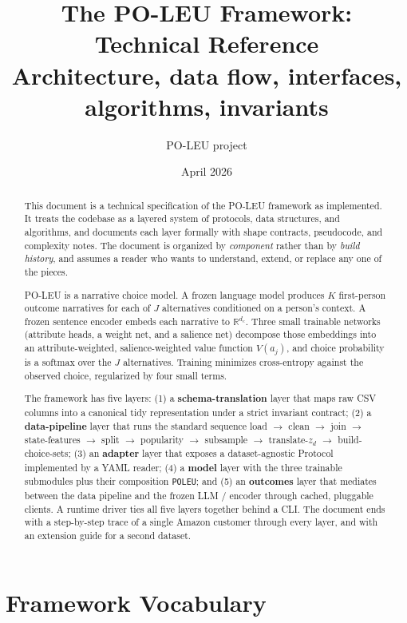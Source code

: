 \documentclass[11pt,a4paper]{article}
\title{The PO-LEU Framework: Technical Reference \\
\large Architecture, data flow, interfaces, algorithms, invariants}
\author{PO-LEU project}
\date{April 2026}
\begin{document}
\maketitle

\begin{abstract}
\noindent
This document is a technical specification of the PO-LEU framework as
implemented. It treats the codebase as a layered system of protocols,
data structures, and algorithms, and documents each layer formally with
shape contracts, pseudocode, and complexity notes. The document is
organized by \emph{component} rather than by \emph{build history}, and
assumes a reader who wants to understand, extend, or replace any one of
the pieces.

PO-LEU is a narrative choice model. A frozen language model produces
$K$ first-person outcome narratives for each of $J$ alternatives
conditioned on a person's context. A frozen sentence encoder embeds
each narrative to $\mathbb{R}^{d_e}$. Three small trainable networks
(attribute heads, a weight net, and a salience net) decompose those
embeddings into an attribute-weighted, salience-weighted value
function $V(a_j)$, and choice probability is a softmax over the $J$
alternatives. Training minimizes cross-entropy against the observed
choice, regularized by four small terms.

The framework has five layers: (1) a \textbf{schema-translation}
layer that maps raw CSV columns into a canonical tidy representation
under a strict invariant contract; (2) a \textbf{data-pipeline} layer
that runs the standard sequence load $\to$ clean $\to$ join $\to$
state-features $\to$ split $\to$ popularity $\to$ subsample $\to$
translate-$z_d$ $\to$ build-choice-sets; (3) an \textbf{adapter} layer
that exposes a dataset-agnostic Protocol implemented by a YAML reader;
(4) a \textbf{model} layer with the three trainable submodules plus
their composition \texttt{POLEU}; and (5) an \textbf{outcomes} layer
that mediates between the data pipeline and the frozen LLM / encoder
through cached, pluggable clients. A runtime driver ties all five
layers together behind a CLI. The document ends with a step-by-step
trace of a single Amazon customer through every layer, and with an
extension guide for a second dataset.
\end{abstract}

\tableofcontents

\newpage

\section{Framework Vocabulary}
\label{sec:vocab}
\end{document}

